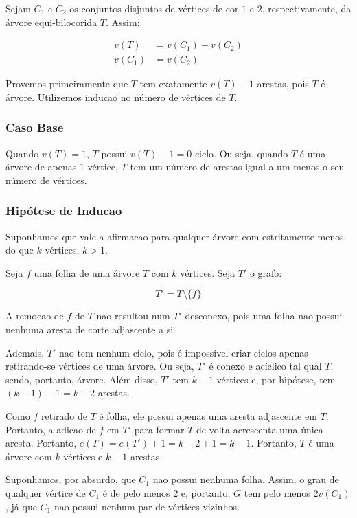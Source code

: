 \documentclass{article}
\begin{document}
 Sejam $C_1$ e $C_2$ os conjuntos disjuntos de vértices de cor $1$ e $2$, respectivamente, da árvore equi-bilocorida $T$. Assim:
 
 
 \begin{align*}
  v(T) &= v(C_1) + v(C_2) \\
  v(C_1) &= v(C_2)
 \end{align*}
 
Provemos primeiramente que $T$ tem exatamente $v(T)  - 1$ arestas, pois $T$ é  árvore. Utilizemos inducao no número de vértices de $T$.

\subsubsection*{Caso Base}

 Quando $v(T) = 1$, $T$ possui $v(T) - 1 = 0$  ciclo. Ou seja, quando $T$ é uma árvore de apenas $1$ vértice, $T$ tem um número de arestas igual a um menos o seu número de vértices.
 
 \subsubsection*{Hipótese de Inducao}
 
 Suponhamos que vale a afirmacao para qualquer árvore com estritamente menos do que $k$ vértices, $k > 1$.
 
 Seja $f$ uma folha de uma árvore $T$ com $k$ vértices. Seja $T'$ o grafo:
 
 $$
 T' = T \setminus \{f\}
 $$
 
 A remocao de $f$ de $T$ nao resultou num $T'$ desconexo, pois uma folha nao possui nenhuma aresta de corte adjascente a si.
 
 Ademais, $T'$ nao tem nenhum ciclo, pois é impossível criar ciclos apenas retirando-se vértices de uma árvore. Ou seja, $T'$ é conexo e acíclico tal qual $T$, sendo, portanto, árvore. Além disso, $T'$ tem $k - 1$ vértices e, por hipótese, tem $(k - 1) - 1 = k - 2$ arestas.
 
 Como $f$ retirado de $T$ é folha, ele possui apenas uma aresta adjascente em $T$. Portanto, a adicao de $f$ em $T'$ para formar $T$ de volta acrescenta uma única aresta. Portanto, $e(T) = e(T') + 1 = k - 2 + 1 = k - 1$. Portanto, $T$ é uma árvore com $k$ vértices e $k - 1$ arestas.
 
 
Suponhamos, por absurdo, que $C_1$ nao possui nenhuma folha. Assim, o grau de qualquer vértice de $C_1$ é de pelo menos $2$ e, portanto, $G$ tem pelo menos $2v(C_1)$, já que $C_1$ nao possui nenhum par de vértices vizinhos.
\end{document}
